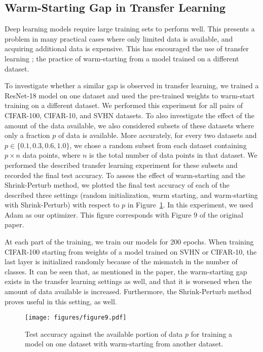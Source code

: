 \subsection{Warm-Starting Gap in Transfer Learning}
Deep learning models require large training sets to perform well. This presents a problem in many practical cases where only limited data is available, and acquiring additional data is expensive. This has encouraged the use of transfer learning \cite{oquab_learning_2014,huang_cross-language_2013,long_unsupervised_2016}; the practice of warm-starting from a model trained on a different dataset. 

To investigate whether a similar gap is observed in transfer learning, we trained a ResNet-18 model on one dataset and used the pre-trained weights to warm-start training on a different dataset. We performed this experiment for all pairs of CIFAR-100, CIFAR-10, and SVHN datasets. To also investigate the effect of the amount of the data available, we also considered subsets of these datasets where only a fraction $p$ of data is available. More accurately, for every two datasets and $p \in \{0.1, 0.3, 0.6, 1.0\}$, we chose a random subset from each dataset containing $p \times n$ data points, where $n$ is the total number of data points in that dataset. We performed the described transfer learning experiment for these subsets and recorded the final test accuracy. To assess the effect of warm-starting and the Shrink-Perturb method, we plotted the final test accuracy of each of the described three settings (random initialization, warm starting, and warm-starting with Shrink-Perturb) with respect to $p$ in Figure~\ref{fig:fig9}. In this experiment, we used Adam as our optimizer. This figure corresponds with Figure 9 of the original paper.



At each part of the training, we train our models for 200 epochs. When training CIFAR-100 starting from weights of a model trained on SVHN or CIFAR-10, the last layer is initialized randomly because of the mismatch in the number of classes. It can be seen that, as mentioned in the paper, the warm-starting gap exists in the transfer learning settings as well, and that it is worsened when the amount of data available is increased. Furthermore, the Shrink-Perturb method proves useful in this setting, as well. 


%
%
%
%
%
%
%
%
%
%
%
%
%
%

%
\begin{figure}
    \vspace{-10pt}
    \centering
    \texttt{[image: figures/figure9.pdf]}
    \caption{Test accuracy against the available portion of data $p$ for training a model on one dataset with warm-starting from another dataset. }
    \label{fig:fig9}
    \vspace{-15pt}
\end{figure}




